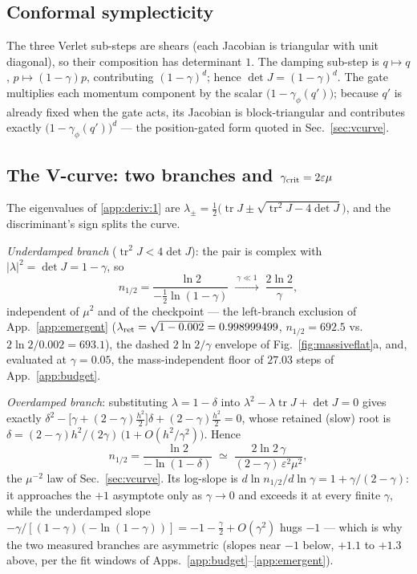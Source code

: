 \documentclass{article}
\begin{document}
\subsection{Conformal symplecticity}\label{app:deriv:2} The three Verlet sub-steps are shears (each Jacobian is triangular with unit diagonal), so their composition has determinant $1$. The damping sub-step is $q\mapsto q$, $p\mapsto(1-\gamma)p$, contributing $(1-\gamma)^d$; hence $\det J=(1-\gamma)^d$. The gate multiplies each momentum component by the scalar $\bigl(1-\gamma_\phi(q')\bigr)$; because $q'$ is already fixed when the gate acts, its Jacobian is block-triangular and contributes exactly $\bigl(1-\gamma_\phi(q')\bigr)^d$ --- the position-gated form quoted in Sec.~\ref{sec:vcurve}.

\subsection{The V-curve: two branches and $\gamma_{\rm crit}=2\varepsilon\mu$}\label{app:deriv:3} The eigenvalues of \ref{app:deriv:1} are $\lambda_\pm=\tfrac12\bigl(\operatorname{tr}J\pm\sqrt{\operatorname{tr}^2J-4\det J}\bigr)$, and the discriminant's sign splits the curve.

\emph{Underdamped branch} ($\operatorname{tr}^2J<4\det J$): the pair is complex with $|\lambda|^2=\det J=1-\gamma$, so
\[
n_{1/2}=\frac{\ln 2}{-\tfrac12\ln(1-\gamma)}\;\xrightarrow{\ \gamma\ll1\ }\;\frac{2\ln2}{\gamma},
\]
independent of $\mu^2$ and of the checkpoint --- the left-branch exclusion of App.~\ref{app:emergent} ($\lambda_{\rm ret}=\sqrt{1-0.002}=0.998999499$, $n_{1/2}=692.5$ vs.\ $2\ln2/0.002=693.1$), the dashed $2\ln2/\gamma$ envelope of Fig.~\ref{fig:massiveflat}a, and, evaluated at $\gamma=0.05$, the mass-independent floor of $27.03$ steps of App.~\ref{app:budget}.

\emph{Overdamped branch}: substituting $\lambda=1-\delta$ into $\lambda^2-\lambda\operatorname{tr}J+\det J=0$ gives exactly $\delta^2-\bigl[\gamma+(2-\gamma)\tfrac{h^2}{2}\bigr]\delta+(2-\gamma)\tfrac{h^2}{2}=0$, whose retained (slow) root is $\delta=(2-\gamma)h^2/(2\gamma)\,\bigl(1+O(h^2/\gamma^2)\bigr)$. Hence
\[
n_{1/2}=\frac{\ln2}{-\ln(1-\delta)}\;\simeq\;\frac{2\ln2\,\gamma}{(2-\gamma)\,\varepsilon^2\mu^2},
\]
the $\mu^{-2}$ law of Sec.~\ref{sec:vcurve}. Its log-slope is $d\ln n_{1/2}/d\ln\gamma=1+\gamma/(2-\gamma)$: it approaches the $+1$ asymptote only as $\gamma\to0$ and exceeds it at every finite $\gamma$, while the underdamped slope $-\gamma/[(1-\gamma)(-\ln(1-\gamma))]=-1-\tfrac{\gamma}{2}+O(\gamma^2)$ hugs $-1$ --- which is why the two measured branches are asymmetric (slopes near $-1$ below, $+1.1$ to $+1.3$ above, per the fit windows of Apps.~\ref{app:budget}--\ref{app:emergent}).
\end{document}
